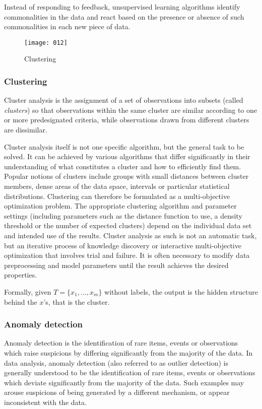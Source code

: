 Instead of responding to feedback, unsupervised learning algorithms identify commonalities in the data and react based on the presence or absence of such commonalities in each new piece of data.

\begin{figure}
    \begin{center}
        \texttt{[image: 012]}
    \end{center}
    \caption{Clustering}
    \end{figure}
    
\subsubsection{Clustering}
Cluster analysis is the assignment of a set of observations into subsets (called \emph{clusters}) so that observations within the same cluster are similar according to one or more predesignated criteria, while observations drawn from different clusters are dissimilar. 

Cluster analysis itself is not one specific algorithm, but the general task to be solved. It can be achieved by various algorithms that differ significantly in their understanding of what constitutes a cluster and how to efficiently find them. Popular notions of clusters include groups with small distances between cluster members, dense areas of the data space, intervals or particular statistical distributions. Clustering can therefore be formulated as a multi-objective optimization problem. The appropriate clustering algorithm and parameter settings (including parameters such as the distance function to use, a density threshold or the number of expected clusters) depend on the individual data set and intended use of the results. Cluster analysis as such is not an automatic task, but an iterative process of knowledge discovery or interactive multi-objective optimization that involves trial and failure. It is often necessary to modify data preprocessing and model parameters until the result achieves the desired properties.

Formally, given \(T = \{x_1, ..., x_m\}\) without labels, the output is the hidden structure behind the \(x\)'s, that is the cluster.

\subsubsection{Anomaly detection}
Anomaly detection is the identification of rare items, events or observations which raise suspicions by differing significantly from the majority of the data.
In data analysis, anomaly detection (also referred to as outlier detection) is generally understood to be the identification of rare items, events or observations which deviate significantly from the majority of the data. Such examples may arouse suspicions of being generated by a different mechanism, or appear inconsistent with the data.

